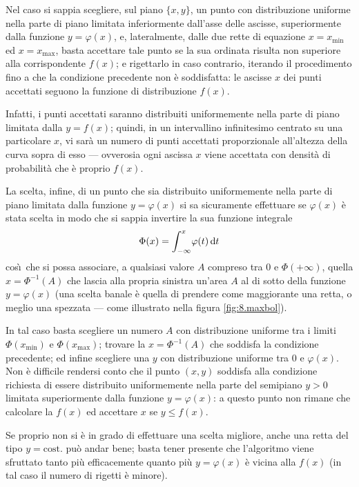 Nel caso si sappia scegliere, sul piano $\{ x,y \}$, un
punto con distribuzione uniforme nella parte di piano
limitata inferiormente dall'asse delle ascisse,
superiormente dalla funzione $y=\varphi(x)$, e,
lateralmente, dalle due rette di equazione $x = x_{\min}$ ed
$x = x_{\max}$, basta accettare tale punto se la sua
ordinata risulta non superiore alla corrispondente $f(x)$; e
rigettarlo in caso contrario, iterando il procedimento fino
a che la condizione precedente non \`e soddisfatta: le
ascisse $x$ dei punti accettati seguono la funzione di
distribuzione $f(x)$.

Infatti, i punti accettati saranno distribuiti uniformemente
nella parte di piano limitata dalla $y=f(x)$; quindi, in un
intervallino infinitesimo centrato su una particolare $x$,
vi sar\`a un numero di punti accettati proporzionale
all'altezza della curva sopra di esso --- ovverosia ogni
ascissa $x$ viene accettata con densit\`a di probabilit\`a
che \`e proprio $f(x)$.

La scelta, infine, di un punto che sia distribuito
uniformemente nella parte di piano limitata dalla funzione
$y=\varphi(x)$ si sa sicuramente effettuare se $\varphi(x)$
\`e stata scelta in modo che si sappia invertire la sua
funzione integrale
\begin{equation*}
  \Phi(x) = \int_{-\infty}^x \! \varphi(t) \, \mathrm{d} t
\end{equation*}
cos\`\i\ che si possa associare, a qualsiasi valore $A$
compreso tra 0 e $\Phi(+\infty)$, quella $x = \Phi^{-1}(A)$
che lascia alla propria sinistra un'area $A$ al di sotto
della funzione $y=\varphi(x)$ (una scelta banale \`e quella
di prendere come maggiorante una retta, o meglio una
spezzata --- come illustrato nella figura
\ref{fig:8.maxbol}).

In tal caso basta scegliere un numero $A$ con distribuzione
uniforme tra i limiti $\Phi(x_{\min})$ e $\Phi(x_{\max})$;
trovare la $x = \Phi^{-1}(A)$ che soddisfa la condizione
precedente; ed infine scegliere una $y$ con distribuzione
uniforme tra 0 e $\varphi(x)$.  Non \`e difficile rendersi
conto che il punto $(x,y)$ soddisfa alla condizione
richiesta di essere distribuito uniformemente nella parte
del semipiano $y>0$ limitata superiormente dalla funzione
$y=\varphi(x)$: a questo punto non rimane che calcolare la
$f(x)$ ed accettare $x$ se $y \leq f(x)$.

Se proprio non si \`e in grado di effettuare una scelta
migliore, anche una retta del tipo $y=\mathrm{cost.}$ pu\`o
andar bene; basta tener presente che l'algoritmo viene
sfruttato tanto pi\`u efficacemente quanto pi\`u
$y=\varphi(x)$ \`e vicina alla $f(x)$ (in tal caso il numero
di rigetti \`e minore).


